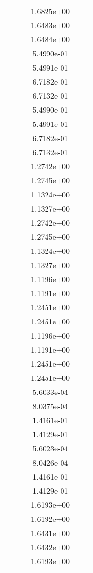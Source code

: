 \begin{xltabular}{\textwidth}{r|rS[table-format=1.3e+2]S[table-format=1.4e+2]S[table-format=1.4e+2]S[table-format=-1.5]}
&  &  & 1.6825e+00 & & \\
&  &  & 1.6483e+00 & & \\
&  &  & 1.6484e+00 & & \\
&  &  & 5.4990e-01 & & \\
&  &  & 5.4991e-01 & & \\
&  &  & 6.7182e-01 & & \\
&  &  & 6.7132e-01 & & \\
&  &  & 5.4990e-01 & & \\
&  &  & 5.4991e-01 & & \\
&  &  & 6.7182e-01 & & \\
&  &  & 6.7132e-01 & & \\
&  &  & 1.2742e+00 & & \\
&  &  & 1.2745e+00 & & \\
&  &  & 1.1324e+00 & & \\
&  &  & 1.1327e+00 & & \\
&  &  & 1.2742e+00 & & \\
&  &  & 1.2745e+00 & & \\
&  &  & 1.1324e+00 & & \\
&  &  & 1.1327e+00 & & \\
&  &  & 1.1196e+00 & & \\
&  &  & 1.1191e+00 & & \\
&  &  & 1.2451e+00 & & \\
&  &  & 1.2451e+00 & & \\
&  &  & 1.1196e+00 & & \\
&  &  & 1.1191e+00 & & \\
&  &  & 1.2451e+00 & & \\
&  &  & 1.2451e+00 & & \\
&  &  & 5.6033e-04 & & \\
&  &  & 8.0375e-04 & & \\
&  &  & 1.4161e-01 & & \\
&  &  & 1.4129e-01 & & \\
&  &  & 5.6023e-04 & & \\
&  &  & 8.0426e-04 & & \\
&  &  & 1.4161e-01 & & \\
&  &  & 1.4129e-01 & & \\
&  &  & 1.6193e+00 & & \\
&  &  & 1.6192e+00 & & \\
&  &  & 1.6431e+00 & & \\
&  &  & 1.6432e+00 & & \\
&  &  & 1.6193e+00 & & \\

\end{xltabular}

